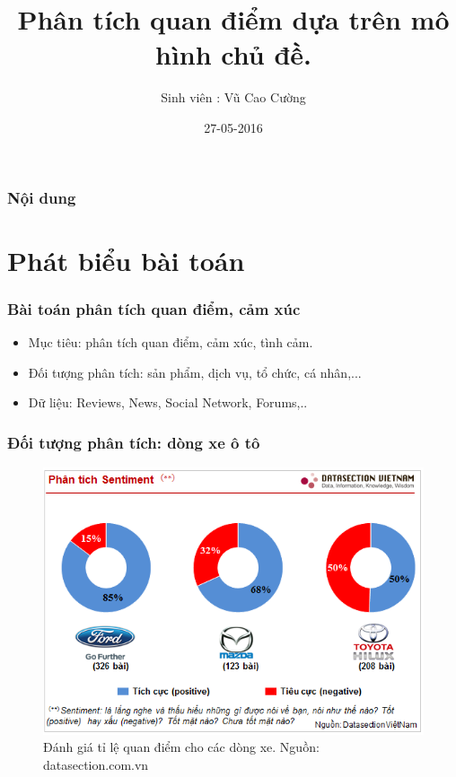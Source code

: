 \documentclass{beamer}
\title[Sentiment Analysis]{Phân tích quan điểm dựa trên mô hình chủ đề.} %
\author{Sinh viên : Vũ Cao Cường} %
\institute[HUST] %
{
Đại học Bách Khoa Hà Nội \\ %
\medskip
\textit{cuongvc93@gmail.com} %
}
\date{27-05-2016}
\begin{document}
\nocite{*}
\begin{frame}
  \titlepage
\end{frame}
\begin{frame}
  \frametitle{Nội dung}
  \tableofcontents
\end{frame}
\fontsize{14pt}{20pt}\selectfont



\section{Phát biểu bài toán}

\begin{frame}
\frametitle{Bài toán phân tích quan điểm, cảm xúc}
\begin{itemize}
\item Mục tiêu: phân tích quan điểm, cảm xúc, tình cảm.
\item Đối tượng phân tích: sản phẩm, dịch vụ, tổ chức, cá nhân,...
\item Dữ liệu: Reviews, News, Social Network, Forums,..

\end{itemize}
\end{frame}

\begin{frame}
\frametitle{Đối tượng phân tích: dòng xe ô tô}
\begin{center}
\begin{figure}
\includegraphics[scale=0.6]{Image/car.png}
\caption*{Đánh giá tỉ lệ quan điểm cho các dòng xe. Nguồn: datasection.com.vn}
\label{labels:1}
\end{figure}
\end{center}
\end{frame}
\end{document}
